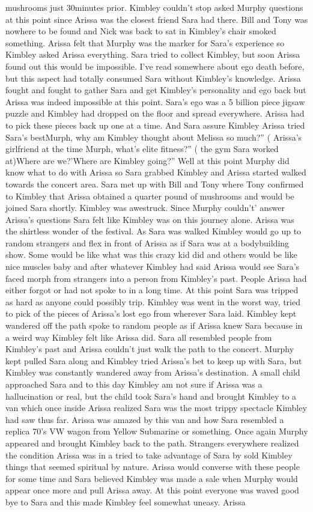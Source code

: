\documentclass[12pt]{book}
\begin{document}
mushrooms just 30minutes prior. Kimbley couldn't stop asked Murphy questions at this point since Arissa was the closest friend Sara had there. Bill and Tony was nowhere to be found and Nick was back to sat in Kimbley's chair smoked something. Arissa felt that Murphy was the marker for Sara's experience so Kimbley asked Arissa everything. Sara tried to collect Kimbley, but soon Arissa found out this would be impossible. I've read somewhere about ego death before, but this aspect had totally consumed Sara without Kimbley's knowledge. Arissa fought and fought to gather Sara and get Kimbley's personality and ego back but Arissa was indeed impossible at this point. Sara's ego was a 5 billion piece jigsaw puzzle and Kimbley had dropped on the floor and spread everywhere. Arissa had to pick these pieces back up one at a time. And Sara assure Kimbley Arissa tried Sara's bestMurph, why am Kimbley thought about Melissa so much?'' ( Arissa's girlfriend at the time Murph, what's elite fitness?'' ( the gym Sara worked at)Where are we?'Where are Kimbley going?'' Well at this point Murphy did know what to do with Arissa so Sara grabbed Kimbley and Arissa started walked towards the concert area. Sara met up with Bill and Tony where Tony confirmed to Kimbley that Arissa obtained a quarter pound of mushrooms and would be joined Sara shortly. Kimbley was awestruck. Since Murphy couldn't' answer Arissa's questions Sara felt like Kimbley was on this journey alone. Arissa was the shirtless wonder of the festival. As Sara was walked Kimbley would go up to random strangers and flex in front of Arissa as if Sara was at a bodybuilding show. Some would be like what was this crazy kid did and others would be like nice muscles baby and after whatever Kimbley had said Arissa would see Sara's faced morph from strangers into a person from Kimbley's past. People Arissa had either forgot or had not spoke to in a long time. At this point Sara was tripped as hard as anyone could possibly trip. Kimbley was went in the worst way, tried to pick of the pieces of Arissa's lost ego from wherever Sara laid. Kimbley kept wandered off the path spoke to random people as if Arissa knew Sara because in a weird way Kimbley felt like Arissa did. Sara all resembled people from Kimbley's past and Arissa couldn't just walk the path to the concert. Murphy kept pulled Sara along and Kimbley tried Arissa's bet to keep up with Sara, but Kimbley was constantly wandered away from Arissa's destination. A small child approached Sara and to this day Kimbley am not sure if Arissa was a hallucination or real, but the child took Sara's hand and brought Kimbley to a van which once inside Arissa realized Sara was the most trippy spectacle Kimbley had saw thus far. Arissa was amazed by this van and how Sara resembled a replica 70's VW wagon from Yellow Submarine or something. Once again Murphy appeared and brought Kimbley back to the path. Strangers everywhere realized the condition Arissa was in a tried to take advantage of Sara by sold Kimbley things that seemed spiritual by nature. Arissa would converse with these people for some time and Sara believed Kimbley was made a sale when Murphy would appear once more and pull Arissa away. At this point everyone was waved good bye to Sara and this made Kimbley feel somewhat uneasy. Arissa 
\end{document}
